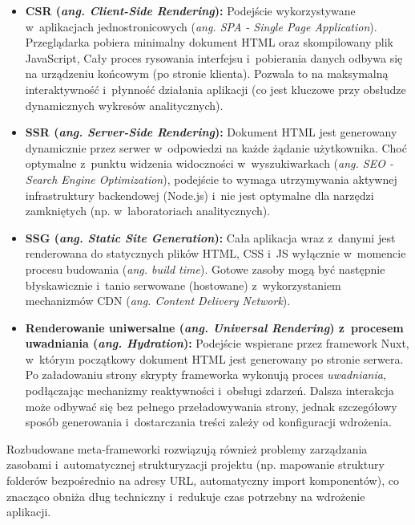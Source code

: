 \begin{itemize}
	\item \textbf{CSR (\textit{ang. Client-Side Rendering}):}
	      Podejście wykorzystywane w~aplikacjach jednostronicowych (\textit{ang. SPA - Single Page Application}).
	      Przeglądarka pobiera minimalny dokument HTML oraz skompilowany plik JavaScript, Cały proces rysowania interfejsu i~pobierania danych odbywa się na urządzeniu końcowym (po stronie klienta).
	      Pozwala to na maksymalną interaktywność i~płynność działania aplikacji (co jest kluczowe przy obsłudze dynamicznych wykresów analitycznych).

	\item \textbf{SSR (\textit{ang. Server-Side Rendering}):}
	      Dokument HTML jest generowany dynamicznie przez serwer w~odpowiedzi na każde żądanie użytkownika.
	      Choć optymalne z~punktu widzenia widoczności w~wyszukiwarkach (\textit{ang. SEO - Search Engine Optimization}), podejście to wymaga utrzymywania aktywnej infrastruktury backendowej (Node.js) i~nie jest optymalne dla narzędzi zamkniętych (np. w~laboratoriach analitycznych).

	\item \textbf{SSG (\textit{ang. Static Site Generation}):}
	      Cała aplikacja wraz z~danymi jest renderowana do statycznych plików HTML, CSS i~JS wyłącznie w~momencie procesu budowania (\textit{ang. build time}).
	      Gotowe zasoby mogą być następnie błyskawicznie i~tanio serwowane (hostowane) z~wykorzystaniem mechanizmów CDN (\textit{ang. Content Delivery Network}).

	\item \textbf{Renderowanie uniwersalne (\textit{ang. Universal Rendering}) z~procesem uwadniania (\textit{ang. Hydration}):}
	      Podejście wspierane przez framework Nuxt, w~którym początkowy dokument HTML jest generowany po stronie serwera.
	      Po załadowaniu strony skrypty frameworka wykonują proces \textit{uwadniania}, podłączając mechanizmy reaktywności i~obsługi zdarzeń.
	      Dalsza interakcja może odbywać się bez pełnego przeładowywania strony, jednak szczegółowy sposób generowania i~dostarczania treści zależy od konfiguracji wdrożenia.
\end{itemize}

Rozbudowane meta-frameworki rozwiązują również problemy zarządzania zasobami i~automatycznej strukturyzacji projektu (np. mapowanie struktury folderów bezpośrednio na adresy URL, automatyczny import komponentów), co znacząco obniża dług techniczny i~redukuje czas potrzebny na wdrożenie aplikacji.

